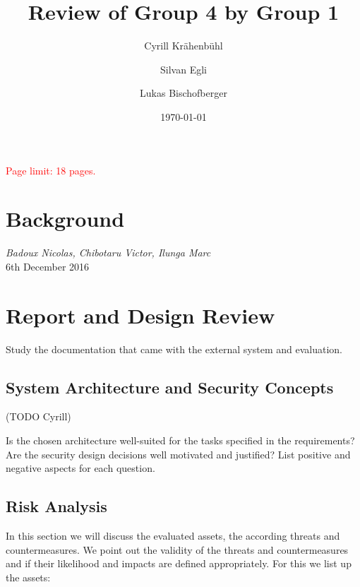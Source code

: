 \documentclass[english]{article}
\title{\huge\sffamily\bfseries Review of Group 4 by Group 1}
\author{Cyrill Kr\"ahenb\"uhl \and Silvan Egli \and Lukas Bischofberger}
\date{\today}
\begin{document}
\maketitle

\begin{center}
{\large\textcolor{red}{Page limit: 18 pages.}}
\end{center}

\tableofcontents
\pagebreak



\section{Background}

 {\it Badoux Nicolas, Chibotaru Victor, Ilunga Marc} \\

 6th December 2016


\section{Report and Design Review}

Study the documentation that came with the external system and evaluation. 

\subsection{System Architecture and Security Concepts} (TODO Cyrill)

Is the chosen architecture well-suited for the tasks specified in the requirements? Are the security design decisions well motivated and justified? List positive and negative aspects for each question.


\subsection{Risk Analysis} %

%
%
In this section we will discuss the evaluated assets, the according threats and countermeasures. We point out the validity of the threats and countermeasures and if their likelihood and impacts are defined appropriately. For this we list up the assets:
\end{document}
